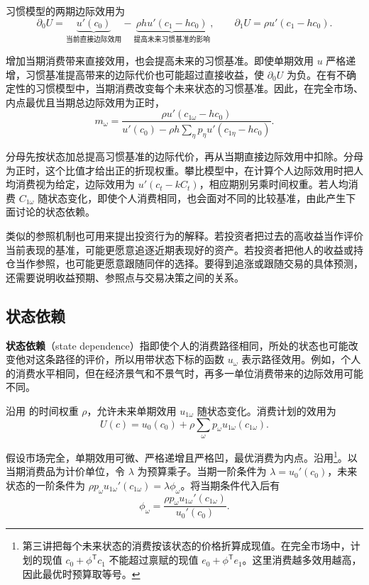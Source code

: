 习惯模型的两期边际效用为
\[
 \partial_0U=\underbrace{u'(c_0)}_{\text{当前直接边际效用}}
 -\underbrace{\rho h u'(c_1-hc_0)}_{\text{提高未来习惯基准的影响}},\qquad
 \partial_1U=\rho u'(c_1-hc_0).
\]

增加当期消费带来直接效用，也会提高未来的习惯基准。即使单期效用 $u$ 严格递增，习惯基准提高带来的边际代价也可能超过直接收益，使 $\partial_0U$ 为负。在有不确定性的习惯模型中，当期消费改变每个未来状态的习惯基准。因此，在完全市场、内点最优且当期总边际效用为正时，
\[
 m_\omega=
 \frac{\rho u'(c_{1\omega}-hc_0)}
 {u'(c_0)-\rho h\sum_\eta p_\eta u'(c_{1\eta}-hc_0)}.
\]

分母先按状态加总提高习惯基准的边际代价，再从当期直接边际效用中扣除。分母为正时，这个比值才给出正的折现权重。攀比模型中，在计算个人边际效用时把人均消费视为给定，边际效用为 $u'(c_t-kC_t)$，相应期别另乘时间权重。若人均消费 $C_{1\omega}$ 随状态变化，即使个人消费相同，也会面对不同的比较基准，由此产生下面讨论的状态依赖。

类似的参照机制也可用来提出投资行为的解释。若投资者把过去的高收益当作评价当前表现的基准，可能更愿意追逐近期表现好的资产。若投资者把他人的收益或持仓当作参照，也可能更愿意跟随同伴的选择。要得到追涨或跟随交易的具体预测，还需要说明收益预期、参照点与交易决策之间的关系。

\subsection{状态依赖}
\begin{tcolorbox}[knowledge,title=状态依赖的效用]
\textbf{状态依赖}（state dependence）指即使个人的消费路径相同，所处的状态也可能改变他对这条路径的评价，所以用带状态下标的函数 $u_\omega$ 表示路径效用。例如，个人的消费水平相同，但在经济景气和不景气时，再多一单位消费带来的边际效用可能不同。
\end{tcolorbox}

沿用 的时间权重 $\rho$，允许未来单期效用 $u_{1\omega}$ 随状态变化。消费计划的效用为
\[
 U(c)=u_0(c_0)+\rho\sum_\omega p_\omega u_{1\omega}(c_{1\omega}).
\]

假设市场完全，单期效用可微、严格递增且严格凹，最优消费为内点。沿用\footnote{第三讲把每个未来状态的消费按该状态的价格折算成现值。在完全市场中，计划的现值 $c_0+\phi^{\mathsf T}c_1$ 不能超过禀赋的现值 $e_0+\phi^{\mathsf T}e_1$。这里消费越多效用越高，因此最优时预算取等号。}。以当期消费品为计价单位，令 $\lambda$ 为预算乘子。当期一阶条件为 $\lambda=u_0'(c_0)$，未来状态的一阶条件为 $\rho p_\omega u_{1\omega}'(c_{1\omega})=\lambda\phi_\omega$。将当期条件代入后有
\[
 \phi_\omega=\frac{\rho p_\omega u_{1\omega}'(c_{1\omega})}{u_0'(c_0)}.
\]

